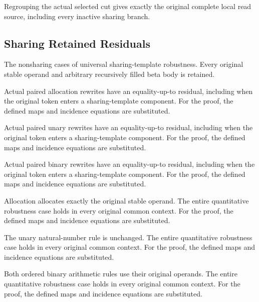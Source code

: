 Regrouping the actual selected cut gives exactly the original complete local read source, including every inactive sharing branch.
\par{}

\subsection{Sharing Retained Residuals}
The nonsharing cases of universal sharing-template robustness. Every original stable operand and arbitrary recursively filled beta body is retained.

Actual paired allocation rewrites have an equality-up-to residual, including when the original token enters a sharing-template component.
For the proof, the defined maps and incidence equations are substituted.
\par{}

Actual paired unary rewrites have an equality-up-to residual, including when the original token enters a sharing-template component.
For the proof, the defined maps and incidence equations are substituted.
\par{}

Actual paired binary rewrites have an equality-up-to residual, including when the original token enters a sharing-template component.
For the proof, the defined maps and incidence equations are substituted.
\par{}

Allocation allocates exactly the original stable operand. The entire quantitative robustness case holds in every original common context.
For the proof, the defined maps and incidence equations are substituted.
\par{}

The unary natural-number rule is unchanged. The entire quantitative robustness case holds in every original common context.
For the proof, the defined maps and incidence equations are substituted.
\par{}

Both ordered binary arithmetic rules use their original operands. The entire quantitative robustness case holds in every original common context.
For the proof, the defined maps and incidence equations are substituted.
\par{}

